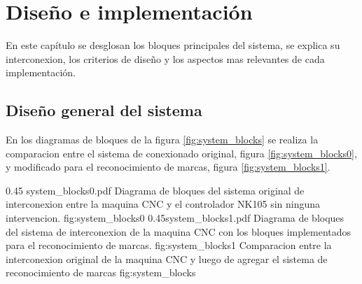 \chapter{Diseño e implementación} %

\label{Chapter3}

En este capítulo se desglosan los bloques principales del sistema, se explica su interconexion, los criterios de diseño y los aspectos mas relevantes de cada implementación.

\section{Diseño general del sistema}

En los diagramas de bloques de la figura \ref{fig:system_blocks} se realiza la comparacion entre el sistema de conexionado original, figura \ref{fig:system_blocks0}, y modificado para el reconocimiento de marcas, figura \ref{fig:system_blocks1}.

\subfigab 
         {0.45} {system_blocks0.pdf} {Diagrama de bloques del sistema original de interconexion entre la maquina CNC y el controlador NK105 sin ninguna intervencion.} {fig:system_blocks0}
         {0.45}{system_blocks1.pdf} {Diagrama de bloques del sistema de interconexion de la maquina CNC con los bloques implementados para el reconocimiento de marcas.} {fig:system_blocks1}
         {Comparacion entre la interconexion original de la maquina CNC y luego de agregar el sistema de reconocimiento de marcas}
         {fig:system_blocks}

